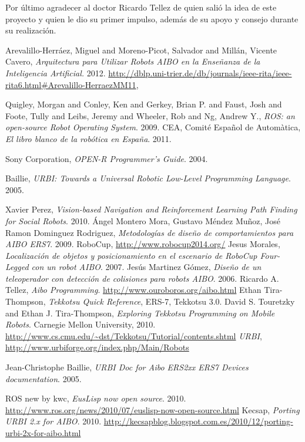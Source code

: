 \documentclass[12pt,a4paper,final,twoside]{book}
\begin{document}
Por último agradecer al doctor Ricardo Tellez de quien salió la idea de este proyecto y quien le dio su primer impulso, además de su apoyo y consejo durante su realización.
\newpage
\clearpage
{}
\begin{thebibliography}{99}
	Arevalillo-Herráez, Miguel and Moreno-Picot, Salvador and Millán, Vicente Cavero,
	\emph{Arquitectura para Utilizar Robots AIBO en la Enseñanza de la Inteligencia Artificial.}
	2012.
	\url{http://dblp.uni-trier.de/db/journals/ieee-rita/ieee-rita6.html#Arevalillo-HerraezMM11},
	
	Quigley, Morgan and Conley, Ken and Gerkey, Brian P. and Faust, Josh and Foote, Tully and Leibs, Jeremy and Wheeler, Rob and Ng, Andrew Y.,
	\emph{ROS: an open-source Robot Operating System}.
	2009.
	CEA, Comité Español de Automàtica,
	\emph{El libro blanco de la robótica en España}.
	2011.
	
  Sony Corporation,
  \emph{OPEN-R Programmer's Guide}.
  2004.

	Baillie,
	\emph{URBI: Towards a Universal Robotic Low-Level Programming Language}.
	2005.
	
	Xavier Perez,
	\emph{Vision-based Navigation and Reinforcement Learning Path Finding for Social Robots}.
	2010.
	Ángel Montero Mora, Gustavo Méndez Muñoz, José Ramon Dominguez Rodriguez,
	\emph{Metodologías de diseño de comportamientos para AIBO ERS7}.
	2009.
	RoboCup, \url{http://www.robocup2014.org/}
	Jesus Morales,
	\emph{Localización de objetos y posicionamiento en el escenario de RoboCup Four-Legged con un robot AIBO}.
	2007.  
	Jesús Martinez Gómez, 
	\emph{Diseño de un teleoperador con detección de colisiones para robots AIBO}. 			2006.
	Ricardo A. Tellez,
	\emph{Aibo Programming}.
	\url{http://www.ouroboros.org/aibo.html}
	Ethan Tira-Thompson,
	\emph{Tekkotsu Quick Reference}, ERS-7, Tekkotsu 3.0.
	David S. Touretzky and Ethan J. Tira-Thompson, 
	\emph{Exploring Tekkotsu Programming on Mobile Robots}.
	Carnegie Mellon University,
	2010.
	\url{http://www.cs.cmu.edu/~dst/Tekkotsu/Tutorial/contents.shtml}
	\emph{URBI},
	\url{http://www.urbiforge.org/index.php/Main/Robots}
	
	Jean-Christophe Baillie,
	\emph{URBI Doc for Aibo ERS2xx ERS7 Devices documentation}.
	2005.

	ROS new by kwc,
	\emph{EusLisp now open source}.
	2010.
	\url{http://www.ros.org/news/2010/07/euslisp-now-open-source.html}
	Kecsap,
	\emph{Porting URBI 2.x for AIBO}.
	2010.
	\url{http://kecsapblog.blogspot.com.es/2010/12/porting-urbi-2x-for-aibo.html}
	
	
\end{thebibliography}
\end{document}

